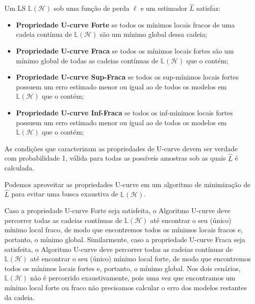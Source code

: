  \begin{definition}
     Um LS $\mathbb{L} \left( \mathcal{H} \right)$ sob uma função de perda $\ell$ e um estimador $\hat{L}$ satisfaz:

     \begin{itemize}
         \item \textbf{Propriedade U-curve Forte} se todos os mínimos locais fracos de uma cadeia contínua de $\mathbb{L} \left( \mathcal{H} \right)$ são um mínimo global dessa cadeia;

         \item \textbf{Propriedade U-curve Fraca} se todos os mínimos locais fortes são um mínimo global de todas as cadeias contínuas de $\mathbb{L} \left( \mathcal{H} \right)$ que o contém;

         \item \textbf{Propriedade U-curve Sup-Fraca} se todos os sup-mínimos locais fortes possuem um erro estimado menor ou igual ao de todos os modelos em $\mathbb{L} \left( \mathcal{H} \right)$ que o contém;

         \item \textbf{Propriedade U-curve Inf-Fraca} se todos os inf-mínimos locais fortes possuem um erro estimado menor ou igual ao de todos os modelos em $\mathbb{L} \left( \mathcal{H} \right)$ que o contém;
     \end{itemize}

     As condições que caracterizam as propriedades de U-curve devem ser verdade com probabilidade 1, válida para todas as possíveis amostras sob as quais $\hat{L}$ é calculada.
 \end{definition}


Podemos aproveitar as propriedades U-curve em um algoritmo de minimização de $\hat{L}$ para evitar uma busca exaustiva de $\mathbb{L} \left( \mathcal{H} \right)$. 
 
Caso a propriedade U-curve Forte seja satisfeita, o Algoritmo U-curve deve percorrer todas as cadeias contínuas de $\mathbb{L} \left( \mathcal{H} \right) $ até encontrar o seu (único) mínimo local fraco, de modo que encontremos todos os mínimos locais fracos e, portanto, o mínimo global. Similarmente, caso a propriedade U-curve Fraca seja satisfeita, o Algoritmo U-curve deve percorrer todas as cadeias contínuas de $\mathbb{L} \left( \mathcal{H} \right) $ até encontrar o seu (único) mínimo local forte, de modo que encontremos todos os mínimos locais fortes e, portanto, o mínimo global. Nos dois cenários, $\mathbb{L} \left( \mathcal{H} \right) $ não é percorrido exaustivamente, pois uma vez que encontramos um mínimo local forte ou fraco não precisamos calcular o erro dos modelos restantes da cadeia.


